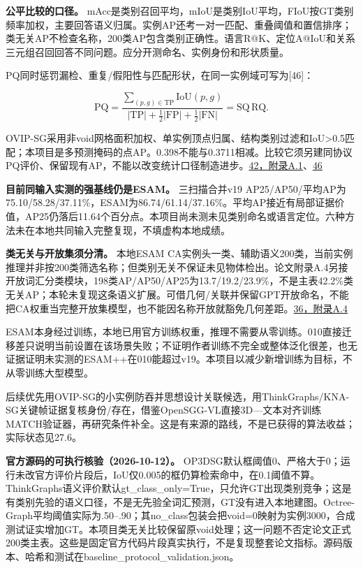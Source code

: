 \documentclass[UTF8,fontset=fandol]{ctexart}
\begin{document}
\textbf{公平比较的口径。} mAcc是类别召回平均，mIoU是类别IoU平均，FIoU按GT类别频率加权，主要回答语义归属。实例AP还考一对一匹配、重叠阈值和置信排序；类无关AP不检查名称，200类AP包含类别正确性。语言R@K、定位A@IoU和关系三元组召回回答不同问题。应分开测命名、实例身份和形状质量。



PQ同时惩罚漏检、重复/假阳性与匹配形状，在同一实例域可写为[46]：



\[
\mathrm{PQ}=\frac{\sum_{(p,g)\in\mathrm{TP}}\mathrm{IoU}(p,g)}
{|\mathrm{TP}|+\tfrac12|\mathrm{FP}|+\tfrac12|\mathrm{FN}|}
=\mathrm{SQ}\,\mathrm{RQ}.
\]

OVIP-SG采用非void网格面积加权、单实例顶点归属、结构类别过滤和IoU>0.5匹配；本项目是多预测掩码的点AP。0.398不能与0.3711相减。比较它须另建同协议PQ评价、保留现有AP，不能以改变统计口径制造进步。\href{https://arxiv.org/html/2608.17633v5}{42，附录A.1}、\href{https://arxiv.org/abs/1801.00868}{46}



\textbf{目前同输入实测的强基线仍是ESAM。} 三扫描合并v19 AP25/AP50/平均AP为75.10/58.28/37.11\%，ESAM为86.74/61.14/37.16\%。平均AP接近有局部证据价值，AP25仍落后11.64个百分点。本项目尚未测未见类别命名或语言定位。六种方法未在本地共同输入完整复现，不填虚构本地成绩。



\textbf{类无关与开放集须分清。} 本地ESAM CA实例头一类、辅助语义200类，当前实例推理并非按200类筛选名称；但类别无关不保证未见物体检出。论文附录A.4另接开放词汇分类模块，198类AP/AP50/AP25为13.7/19.2/23.9\%，不是主表42.2\%类无关AP；本轮未复现这条语义扩展。可借几何/关联并保留GPT开放命名，不能把CA权重当完整开放集模型，也不能因名称开放就豁免几何差距。\href{https://arxiv.org/html/2408.11811v3}{36，附录A.4}



ESAM本身经过训练，本地已用官方训练权重，推理不需要从零训练。010直接迁移差只说明当前设置在该场景失败；不证明作者训练不完全或整体泛化很差，也无证据证明未实测的ESAM++在010能超过v19。本项目以减少新增训练为目标，不从零训练大型模型。



后续优先用OVIP-SG的小实例防吞并思想设计关联候选，用ThinkGraphs/KNA-SG关键帧证据复核身份/存在，借鉴OpenSGG-VL直接3D—文本对齐训练MATCH验证器，再研究条件补全。这是有来源的路线，不是已获得的算法收益；实际状态见27.6。



\textbf{官方源码的可执行核验（2026-10-12）。} OP3DSG默认框阈值0、严格大于0；运行未改官方评价片段后，IoU仅0.005的框仍算检索命中，在0.1阈值不算。ThinkGraphs语义评价默认gt\_class\_only=True，只允许GT出现类别竞争；这是有类别先验的语义口径，不是无先验全词汇预测，GT没有进入本地建图。Octree-Graph平均阈值实际为.50–.90；其no\_class包装会把void=0映射为实例3000，合成测试证实增加GT。本项目类无关比较保留原void处理；这一问题不否定论文正式200类主表。这些是固定官方代码片段真实执行，不是复现整套论文指标。源码版本、哈希和测试在baseline\_protocol\_validation.json。
\end{document}
